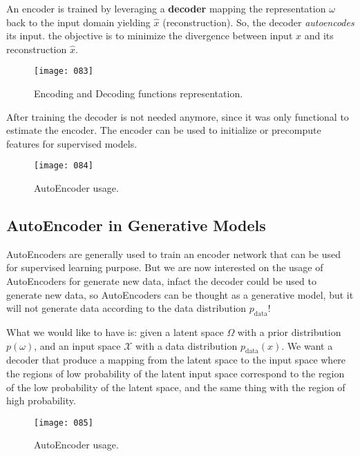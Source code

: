 An encoder is trained by leveraging a \textbf{decoder} mapping the representation \(\omega\) back to the input domain yielding \(\hat{x}\) (reconstruction). So, the decoder \emph{autoencodes} its input. the objective is to minimize the divergence between input \(x\) and its reconstruction \(\hat{x}\).

\begin{figure}[h!]
    \centering
    \texttt{[image: 083]}
    \caption{Encoding and Decoding functions representation.}
    \label{fig:083}
\end{figure}

After training the decoder is not needed anymore, since it was only functional to estimate the encoder. The encoder can be used to initialize or precompute features for supervised models.

\begin{figure}[h!]
    \centering
    \texttt{[image: 084]}
    \caption{AutoEncoder usage.}
    \label{fig:084}
\end{figure}

\subsection{AutoEncoder in Generative Models}
AutoEncoders are generally used to train an encoder network that can be used for supervised learning purpose. But we are now interested on the usage of AutoEncoders for generate new data, infact the decoder could be used to generate new data, so AutoEncoders can be thought as a generative model, but it will not generate data according to the data distribution \(p_\text{data}\)!

What we would like to have is: given a latent space \(\Omega\) with a prior distribution \(p(\omega)\), and an input space \(\mathcal{X}\) with a data distribution \(p_\text{data}(x)\). We want a decoder that produce a mapping from the latent space to the input space where the regions of low probability of the latent input space correspond to the region of the low probability of the latent space, and the same thing with the region of high probability.

\begin{figure}[h!]
    \centering
    \texttt{[image: 085]}
    \caption{AutoEncoder usage.}
    \label{fig:085}
\end{figure}

